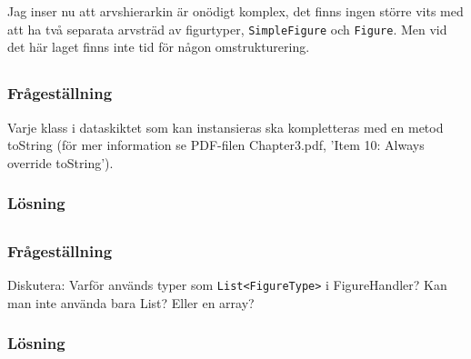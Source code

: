 Jag inser nu att arvshierarkin är onödigt komplex, det finns ingen större vits
med att ha två separata arvsträd av figurtyper, \texttt{SimpleFigure} och
\texttt{Figure}. Men vid det här laget finns inte tid för någon
omstrukturering.


\subsection{}\label{sec:uppg2b}
\subsubsection*{Frågeställning}
Varje klass i dataskiktet som kan instansieras ska kompletteras med en metod
toString (för mer information se PDF-filen Chapter3.pdf, ’Item 10: Always
override toString’).

\subsubsection*{Lösning}


\subsection{}\label{sec:uppg2c}
\subsubsection*{Frågeställning}
Diskutera: Varför används typer som \texttt{List<FigureType>} i FigureHandler?
Kan man inte använda bara List? Eller en array?


\subsubsection*{Lösning}


